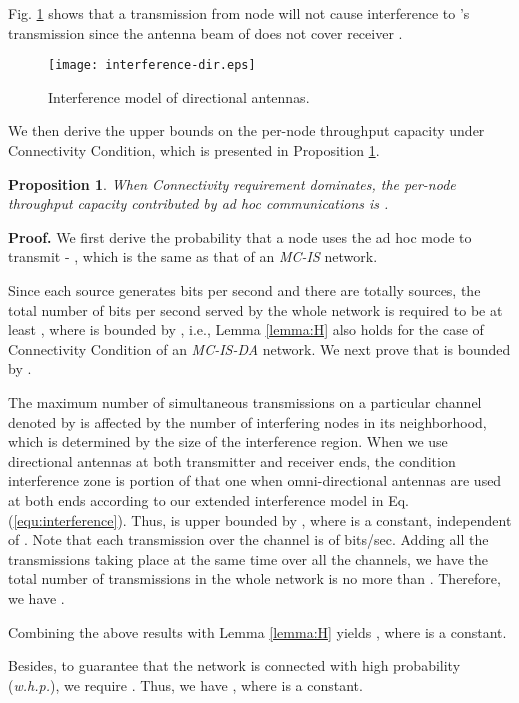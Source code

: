 \documentclass[10pt,journal]{IEEEtran}
\newtheorem{proposition}{Proposition}
\def\done{\hspace*{\fill} }
\begin{document}
Fig. \ref{fig:interference-dir} shows that a transmission from node  will not cause interference to 's transmission since the antenna beam of  does not cover receiver .

\begin{figure}[t]
\centering
\texttt{[image: interference-dir.eps]}
\caption{Interference model of directional antennas.}
\label{fig:interference-dir}
\end{figure}


We then derive the upper bounds on the per-node throughput capacity under Connectivity Condition, which is presented in Proposition \ref{prop:regime-i-DA}.

\begin{proposition}
\label{prop:regime-i-DA}
When Connectivity requirement dominates, the per-node throughput capacity contributed by ad hoc communications is .
\end{proposition}

\textbf{Proof.} 
We first derive the probability that a node uses the ad hoc mode to transmit - , 
which is the same as that of an \emph{MC-IS} network. 

Since each source generates  bits per second and there are totally  sources, the total number of bits per second served by the whole network is required to be at least , where  is bounded by , i.e., Lemma \ref{lemma:H} also holds for the case of Connectivity Condition of an \emph{MC-IS-DA} network. We next prove that  is bounded by .

The maximum number of simultaneous transmissions on a particular channel denoted by  is affected by the number of interfering nodes in its neighborhood, which is determined by the size of the interference region. When we use directional antennas at both transmitter and receiver ends, the condition interference zone is  portion of that one when omni-directional antennas are used at both ends according to our extended interference model in Eq. (\ref{equ:interference}). Thus,  is upper bounded by , where  is a constant, independent of . Note that each transmission over the  channel is of  bits/sec. Adding all the transmissions taking place at the same time over all the  channels, we have the total number of transmissions in the whole network is no more than . Therefore, we have .

Combining the above results with Lemma \ref{lemma:H} yields , where  is a constant. 

Besides, to guarantee that the network is connected with high probability (\textit{w.h.p.}), we require  \cite{Gupta:Kumar}. Thus, we have , where  is a constant.
\done
\end{document}
